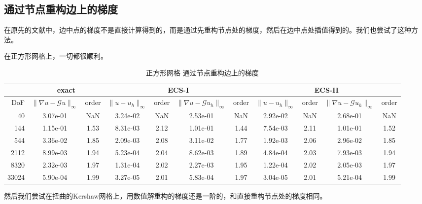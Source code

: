 \documentclass[12pt,a4paper]{article}
\theoremstyle{plain}
\begin{document}
\newpage
\subsection*{通过节点重构边上的梯度}

在原先的文献中，边中点的梯度不是直接计算得到的，而是通过先重构节点处的梯度，然后在边中点处插值得到的。我们也尝试了这种方法。

在正方形网格上，一切都很顺利。

\begin{table}[h]
\centering
\scriptsize
\begin{tabular}{r|cc|cc|cc|cc|cc}
\hline
& \multicolumn{2}{c|}{exact} & \multicolumn{4}{c}{ECS-I} & \multicolumn{4}{|c}{ECS-II} \\
\hline
DoF & $\|\nabla u - \mathcal{G} u\|_\infty$ & order & $\|u - u_h\|_\infty$ & order & $\|\nabla u - \mathcal{G} u_h\|_\infty$ & order & $\|u - u_h\|_\infty$ & order & $\|\nabla u - \mathcal{G} u_h\|_\infty$ & order \\
\hline
40 & 3.07e-01 & NaN & 3.24e-02 & NaN & 2.53e-01 & NaN & 2.92e-02 & NaN & 2.68e-01 & NaN \\
144 & 1.15e-01 & 1.53 & 8.31e-03 & 2.12 & 1.01e-01 & 1.44 & 7.54e-03 & 2.11 & 1.01e-01 & 1.52 \\
544 & 3.36e-02 & 1.85 & 2.09e-03 & 2.08 & 3.11e-02 & 1.77 & 1.92e-03 & 2.06 & 2.96e-02 & 1.85 \\
2112 & 8.99e-03 & 1.94 & 5.23e-04 & 2.04 & 8.62e-03 & 1.89 & 4.84e-04 & 2.03 & 7.93e-03 & 1.94 \\
8320 & 2.32e-03 & 1.97 & 1.31e-04 & 2.02 & 2.27e-03 & 1.95 & 1.22e-04 & 2.02 & 2.05e-03 & 1.97 \\
33024 & 5.90e-04 & 1.99 & 3.27e-05 & 2.01 & 5.83e-04 & 1.97 & 3.04e-05 & 2.01 & 5.21e-04 & 1.99 \\
\hline
\end{tabular}
\caption{正方形网格 通过节点重构边上的梯度}
\end{table}

然后我们尝试在扭曲的Kershaw网格上，用数值解重构的梯度还是一阶的，和直接重构节点处的梯度相同。
\end{document}

